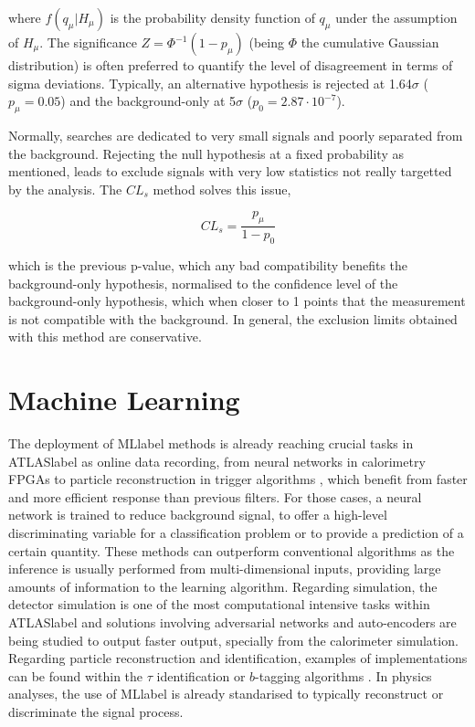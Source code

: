 where $f(q_\mu|H_\mu)$ is the probability density function of $q_\mu$ under the assumption of $H_\mu$. The significance $Z=\Phi^{-1}(1-p_\mu)$ (being $\Phi$ the cumulative Gaussian distribution) is often preferred to quantify the level of disagreement in terms of sigma deviations. Typically, an alternative hypothesis is rejected at 1.64$\sigma$ ($p_\mu=0.05$) and the background-only at 5$\sigma$ ($p_0=2.87\cdot10^{-7}$).

Normally, searches are dedicated to very small signals and poorly separated from the background. Rejecting the null hypothesis at a fixed probability as mentioned, leads to exclude signals with very low statistics not really targetted by the analysis. %
The $CL_{s}$ method solves this issue,

\begin{equation}
    CL_{s}=\frac{p_\mu}{1-p_0}
\end{equation}

which is the previous p-value, which any bad compatibility benefits the background-only hypothesis, normalised to the confidence level of the background-only hypothesis, which when closer to 1 points that the measurement is not compatible with the background. In general, the exclusion limits obtained with this method are conservative.

\section{Machine Learning}

The deployment of \acrshort{MLlabel} methods is already reaching crucial tasks in \acrshort{ATLASlabel} as online data recording, from neural networks in calorimetry FPGAs  %
to particle reconstruction in trigger algorithms %
, which benefit from faster and more efficient response than previous filters. For those cases, a neural network is trained to reduce background signal, to offer a high-level discriminating variable for a classification problem or to provide a prediction of a certain quantity. These methods can outperform conventional algorithms as the inference is usually performed from multi-dimensional inputs, providing large amounts of information to the learning algorithm. Regarding simulation, the detector simulation is one of the most computational intensive tasks within \acrshort{ATLASlabel} and solutions involving adversarial networks and auto-encoders are being studied to output faster output, specially from the calorimeter simulation. Regarding particle reconstruction and identification, examples of implementations can be found within the $\tau$ identification %
 or $b$-tagging algorithms %
 . In physics analyses, the use of \acrshort{MLlabel} is already standarised to typically reconstruct or discriminate the signal process.

